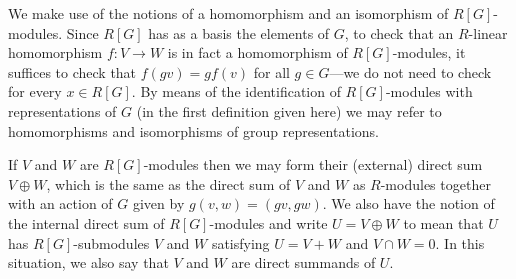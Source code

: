 We make use of the notions of a homomorphism and an isomorphism of $R[G]$-modules. Since $R[G]$ has as a basis the elements of $G$, to check that an $R$-linear homomorphism $f:V\to W$ is in fact a homomorphism of $R[G]$-modules, it suffices to check that $f(gv)=gf(v)$ for all $g\in G$---we do not need to check for every $x\in R[G]$. By means of the identification of $R[G]$-modules with representations of $G$ (in the first definition given here) we may refer to homomorphisms and isomorphisms of group representations.\par
If $V$ and $W$ are $R[G]$-modules then we may form their (external) direct sum
$V\oplus W$, which is the same as the direct sum of $V$ and $W$ as $R$-modules together with an action of $G$ given by $g(v,w)=(gv,gw)$. We also have the notion of the internal direct sum of $R[G]$-modules and write $U=V\oplus W$ to mean that $U$ has $R[G]$-submodules $V$ and $W$ satisfying $U=V+W$ and $V\cap W=0$. In this situation, we also say that $V$ and $W$ are direct summands of $U$.
